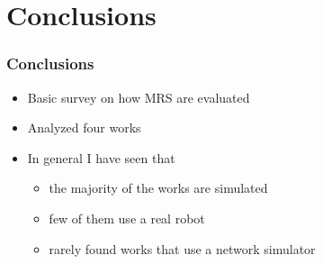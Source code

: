 \section{Conclusions}

\begin{frame}
	\frametitle{Conclusions}
	
	\begin{itemize}
		\item Basic survey on how MRS are evaluated
		
		\item Analyzed four works
		
		\item In general I have seen that
		
		\begin{itemize}
			\item the majority of the works are simulated
			
			\item few of them use a real robot
			
			\item rarely found works that use a network simulator
		\end{itemize}
	\end{itemize}
\end{frame}
